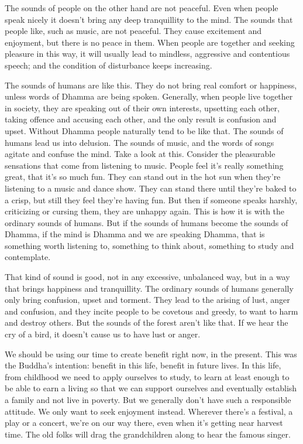 The sounds of people on the other hand are not peaceful. Even when people speak nicely it doesn't bring any deep tranquillity to the mind. The sounds that people like, such as music, are not peaceful. They cause excitement and enjoyment, but there is no peace in them. When people are together and seeking pleasure in this way, it will usually lead to mindless, aggressive and contentious speech; and the condition of disturbance keeps increasing. 

The sounds of humans are like this. They do not bring real comfort or happiness, unless words of Dhamma are being spoken. Generally, when people live together in society, they are speaking out of their own interests, upsetting each other, taking offence and accusing each other, and the only result is confusion and upset. Without Dhamma people naturally tend to be like that. The sounds of humans lead us into delusion. The sounds of music, and the words of songs agitate and confuse the mind. Take a look at this. Consider the pleasurable sensations that come from listening to music. People feel it's really something great, that it's so much fun. They can stand out in the hot sun when they're listening to a music and dance show. They can stand there until they're baked to a crisp, but still they feel they're having fun. But then if someone speaks harshly, criticizing or cursing them, they are unhappy again. This is how it is with the ordinary sounds of humans. But if the sounds of humans become the sounds of Dhamma, if the mind is Dhamma and we are speaking Dhamma, that is something worth listening to, something to think about, something to study and contemplate. 

That kind of sound is good, not in any excessive, unbalanced way, but in a way that brings happiness and tranquillity. The ordinary sounds of humans generally only bring confusion, upset and torment. They lead to the arising of lust, anger and confusion, and they incite people to be covetous and greedy, to want to harm and destroy others. But the sounds of the forest aren't like that. If we hear the cry of a bird, it doesn't cause us to have lust or anger. 

We should be using our time to create benefit right now, in the present. This was the Buddha's intention: benefit in this life, benefit in future lives. In this life, from childhood we need to apply ourselves to study, to learn at least enough to be able to earn a living so that we can support ourselves and eventually establish a family and not live in poverty. But we generally don't have such a responsible attitude. We only want to seek enjoyment instead. Wherever there's a festival, a play or a concert, we're on our way there, even when it's getting near harvest time. The old folks will drag the grandchildren along to hear the famous singer. 

